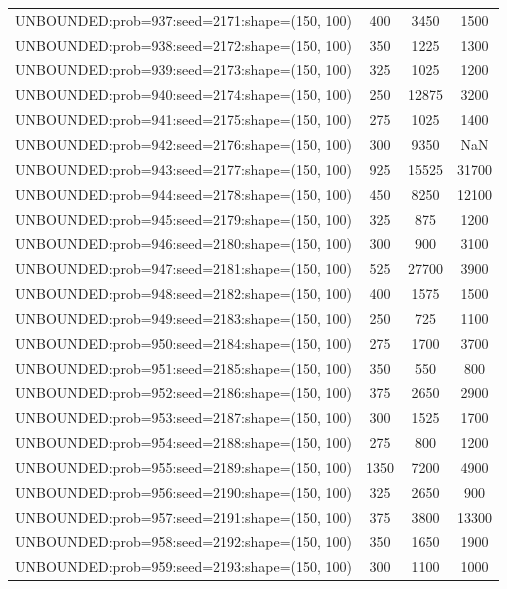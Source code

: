 \begin{longtable}{lccc}
UNBOUNDED:prob=937:seed=2171:shape=(150, 100) &      400 &  3450 &   1500 \\
UNBOUNDED:prob=938:seed=2172:shape=(150, 100) &      350 &  1225 &   1300 \\
UNBOUNDED:prob=939:seed=2173:shape=(150, 100) &      325 &  1025 &   1200 \\
UNBOUNDED:prob=940:seed=2174:shape=(150, 100) &      250 & 12875 &   3200 \\
UNBOUNDED:prob=941:seed=2175:shape=(150, 100) &      275 &  1025 &   1400 \\
UNBOUNDED:prob=942:seed=2176:shape=(150, 100) &      300 &  9350 &    NaN \\
UNBOUNDED:prob=943:seed=2177:shape=(150, 100) &      925 & 15525 &  31700 \\
UNBOUNDED:prob=944:seed=2178:shape=(150, 100) &      450 &  8250 &  12100 \\
UNBOUNDED:prob=945:seed=2179:shape=(150, 100) &      325 &   875 &   1200 \\
UNBOUNDED:prob=946:seed=2180:shape=(150, 100) &      300 &   900 &   3100 \\
UNBOUNDED:prob=947:seed=2181:shape=(150, 100) &      525 & 27700 &   3900 \\
UNBOUNDED:prob=948:seed=2182:shape=(150, 100) &      400 &  1575 &   1500 \\
UNBOUNDED:prob=949:seed=2183:shape=(150, 100) &      250 &   725 &   1100 \\
UNBOUNDED:prob=950:seed=2184:shape=(150, 100) &      275 &  1700 &   3700 \\
UNBOUNDED:prob=951:seed=2185:shape=(150, 100) &      350 &   550 &    800 \\
UNBOUNDED:prob=952:seed=2186:shape=(150, 100) &      375 &  2650 &   2900 \\
UNBOUNDED:prob=953:seed=2187:shape=(150, 100) &      300 &  1525 &   1700 \\
UNBOUNDED:prob=954:seed=2188:shape=(150, 100) &      275 &   800 &   1200 \\
UNBOUNDED:prob=955:seed=2189:shape=(150, 100) &     1350 &  7200 &   4900 \\
UNBOUNDED:prob=956:seed=2190:shape=(150, 100) &      325 &  2650 &    900 \\
UNBOUNDED:prob=957:seed=2191:shape=(150, 100) &      375 &  3800 &  13300 \\
UNBOUNDED:prob=958:seed=2192:shape=(150, 100) &      350 &  1650 &   1900 \\
UNBOUNDED:prob=959:seed=2193:shape=(150, 100) &      300 &  1100 &   1000 \\

\end{longtable}
